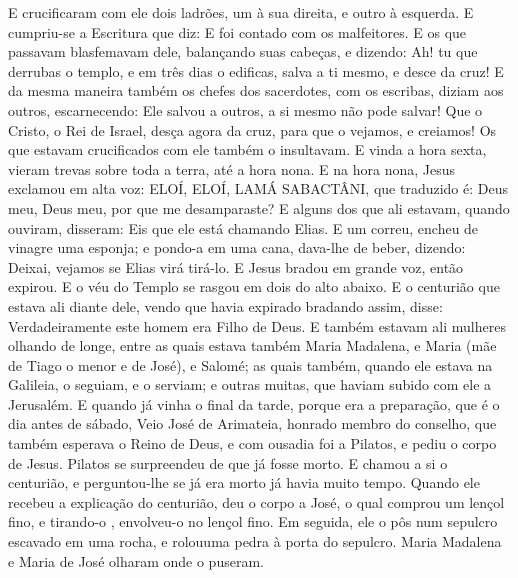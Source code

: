 {  E crucificaram com ele dois ladrões,
 um à sua direita, e outro à esquerda.
  E cumpriu-se a Escritura que diz: E foi contado com os malfeitores.
  E os que passavam blasfemavam dele, balançando suas cabeças, e dizendo: Ah! tu que derrubas o templo, e em três dias o edificas,
  salva a ti mesmo, e desce da cruz!
  E da mesma maneira também os chefes dos sacerdotes, com os escribas, diziam aos outros, escarnecendo: Ele salvou a outros, a si mesmo não pode salvar!
  Que o Cristo, o Rei de Israel, desça agora da cruz, para que o vejamos, e creiamos! Os que estavam crucificados com ele também o insultavam.
  E vinda a hora sexta, vieram trevas sobre toda a terra, até a hora nona.
  E na hora nona, Jesus exclamou em alta voz: ELOÍ, ELOÍ, LAMÁ SABACTÂNI, que traduzido é: Deus meu, Deus meu, por que me desamparaste?
  E alguns dos que ali estavam, quando ouviram, disseram: Eis que ele está chamando Elias.
  E um correu, encheu de vinagre uma esponja; e pondo-a em uma cana, dava-lhe de beber, dizendo: Deixai, vejamos se Elias virá tirá-lo.
  E Jesus bradou em grande voz, então expirou.
  E o véu do Templo se rasgou em dois do alto abaixo.
  E o centurião que estava ali diante dele, vendo que havia expirado bradando assim, disse: Verdadeiramente este homem era Filho de Deus.
  E também estavam ali
{} mulheres olhando de longe, entre as quais estava também Maria Madalena, e Maria (mãe de Tiago o menor e de José), e Salomé;
  as quais também, quando ele estava na Galileia, o seguiam, e o serviam; e outras muitas, que haviam subido com ele a Jerusalém.
  E quando já vinha o final da tarde, porque era a preparação, que é o dia antes de sábado,
  Veio José de Arimateia, honrado membro do conselho, que também esperava o Reino de Deus, e com ousadia foi a Pilatos, e pediu o corpo de Jesus.
  Pilatos se surpreendeu de que já fosse morto. E chamou a si o centurião, e perguntou-lhe se já era morto já havia muito tempo.
  Quando ele recebeu a explicação do centurião, deu o corpo a José,
  o qual comprou um lençol fino, e tirando-o
{},  envolveu-o no lençol fino. Em seguida, ele o pôs num sepulcro escavado em uma rocha, e rolouuma pedra à porta do sepulcro.
  Maria Madalena e Maria
{} de José olharam onde o puseram.
\par }

